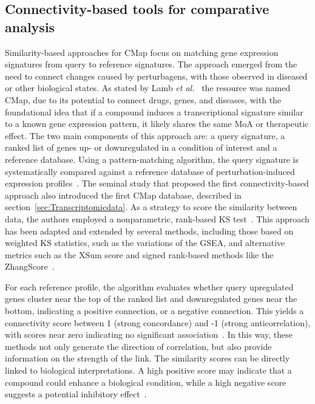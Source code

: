 \subsection{Connectivity-based tools for comparative analysis} %
\label{sub:connectivity-basedmethods}

Similarity-based approaches for \gls{CMap} focus on matching gene expression signatures from query to reference signatures. 
The approach emerged from the need to connect changes caused by perturbagens, with those observed in diseased or other biological states.
As stated by Lamb \textit{et al.}~\cite{RN34} the resource was named \gls{CMap}, due to its potential to connect drugs, genes, and diseases, with the foundational idea that if a compound induces a transcriptional signature similar to a known gene expression pattern, it likely shares the same \gls{MoA} or therapeutic effect. 
The two main components of this approach are: a query signature, a ranked list of genes up- or downregulated in a condition of interest and a reference database.  
Using a pattern-matching algorithm, the query signature is systematically compared against a reference database of perturbation-induced expression profiles~\cite{RN155}. 
The seminal study that proposed the first connectivity-based approach also introduced the first \gls{CMap} database, described in section~\ref{sec:Transcriptomicdata}. 
As a strategy to score the similarity between data, the authors employed a nonparametric, rank-based \gls{KS} test~\cite{RN34, RN79}. 
This approach has been adapted and extended by several methods, including those based on weighted \gls{KS} statistics, such as the variations of the \gls{GSEA}, and alternative metrics such as the \gls{XSum} score and signed rank-based methods like the ZhangScore~\cite{RN79}. 

For each reference profile, the algorithm evaluates whether query upregulated genes cluster near the top of the ranked list and downregulated genes near the bottom, indicating a positive connection, or a negative connection. 
This yields a connectivity score between 1 (strong concordance) and -1 (strong anticorrelation), with scores near zero indicating no significant association~\cite{RN34}. 
In this way, these methods not only generate the direction of correlation, but also provide information on the strength of the link. 
The similarity scores can be directly linked to biological interpretations. 
A high positive score may indicate that a compound could enhance a biological condition, while a high negative score suggests a potential inhibitory effect~\cite{RN102}. 

